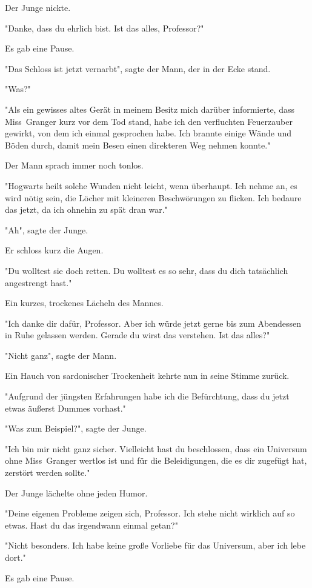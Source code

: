 {Der Junge nickte.

"Danke, dass du ehrlich bist. Ist das alles, Professor?"

Es gab eine Pause.

"Das Schloss ist jetzt vernarbt", sagte der Mann, der in der Ecke stand.

"Was?"

"Als ein gewisses altes Gerät in meinem Besitz mich darüber informierte, dass Miss~Granger kurz vor dem Tod stand, habe ich den verfluchten Feuerzauber gewirkt, von dem ich einmal gesprochen habe. Ich brannte einige Wände und Böden durch, damit mein Besen einen direkteren Weg nehmen konnte."

Der Mann sprach immer noch tonlos.

"Hogwarts heilt solche Wunden nicht leicht, wenn überhaupt. Ich nehme an, es wird nötig sein, die Löcher mit kleineren Beschwörungen zu flicken. Ich bedaure das jetzt, da ich ohnehin zu spät dran war."

"Ah", sagte der Junge.

Er schloss kurz die Augen.

"Du wolltest sie doch retten. Du wolltest es so sehr, dass du dich tatsächlich angestrengt hast."

Ein kurzes, trockenes Lächeln des Mannes.

"Ich danke dir dafür, Professor. Aber ich würde jetzt gerne bis zum Abendessen in Ruhe gelassen werden. Gerade du wirst das verstehen. Ist das alles?"

"Nicht ganz", sagte der Mann.

Ein Hauch von sardonischer Trockenheit kehrte nun in seine Stimme zurück.

"Aufgrund der jüngsten Erfahrungen habe ich die Befürchtung, dass du jetzt etwas äußerst Dummes vorhast."

"Was zum Beispiel?", sagte der Junge.

"Ich bin mir nicht ganz sicher. Vielleicht hast du beschlossen, dass ein Universum ohne Miss~Granger wertlos ist und für die Beleidigungen, die es dir zugefügt hat, zerstört werden sollte."

Der Junge lächelte ohne jeden Humor.

"Deine eigenen Probleme zeigen sich, Professor. Ich stehe nicht wirklich auf so etwas. Hast du das irgendwann einmal getan?"

"Nicht besonders. Ich habe keine große Vorliebe für das Universum, aber ich lebe dort."

Es gab eine Pause.

}
